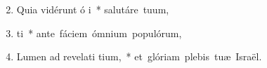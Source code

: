 \begin{flushleft}
\begin{enumerate}[leftmargin=*]
\setcounter{enumi}{1}
\item Quia vidérunt ó i~* \mbox{salutáre tuum,}

\item {} ti~* \mbox{ante fáciem ómnium populórum,}

\item Lumen ad revelati tium,~* \mbox{et glóriam plebis tuæ Israël.}\end{enumerate}
\end{flushleft}
